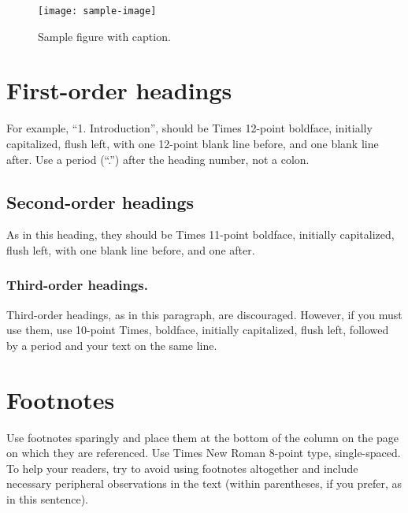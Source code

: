 \documentclass[10pt,sigconf, review]{article}
\begin{document}
\begin{figure}[thb]
    \centering
	\texttt{[image: sample-image]}
	\caption{Sample figure with caption.}
	\label{fig: sample-figure}       %
\end{figure}

\section{First-order headings}

For example, “1. Introduction”, should be Times 12-point boldface, initially
capitalized, flush left, with one 12-point blank line before, and one blank
line after. Use a period (“.”) after the heading number, not a colon. 

\subsection{Second-order headings}
 
As in this heading, they should be Times 11-point boldface, initially
capitalized, flush left, with one blank line before, and one after. 

\subsubsection{Third-order headings. }

Third-order headings, as in this paragraph, are discouraged. However, if you
must use them, use 10-point Times, boldface, initially capitalized, flush left,
followed by a period and your text on the same line. 

\section{Footnotes}

      Use footnotes sparingly and place them at the bottom of the column on the
      page on which they are referenced. Use Times New Roman 8-point type,
      single-spaced. To help your readers, try to avoid using footnotes
      altogether and include necessary peripheral observations in the text
      (within parentheses, if you prefer, as in this sentence). 

\end{document}
